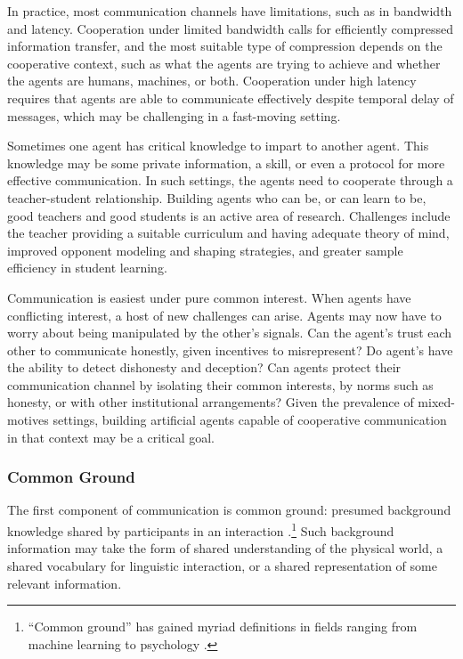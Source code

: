 \documentclass[11pt, a4paper, logo, onecolumn, nonumbering]{deepmind}
\begin{document}
In practice, most communication channels have limitations, such as in bandwidth and latency. 
Cooperation under limited bandwidth calls for efficiently compressed information transfer, and the most suitable type of compression depends on the cooperative context, such as what the agents are trying to achieve and whether the agents are humans, machines, or both. Cooperation under high latency requires that agents are able to communicate effectively despite temporal delay of messages, which may be challenging in a fast-moving setting.

Sometimes one agent has critical knowledge to impart to another agent. This knowledge may be some private information, a skill, or even a protocol for more effective communication. In such settings, the agents need to cooperate through a teacher-student relationship. Building agents who can be, or can learn to be, good teachers and good students is an active area of research. Challenges include the teacher providing a suitable curriculum and having adequate theory of mind, improved opponent modeling and shaping strategies, and greater sample efficiency in student learning.  




Communication is easiest under pure common interest. When agents have conflicting interest, a host of new challenges can arise. Agents may now have to worry about being manipulated by the other's signals. Can the agent's trust each other to communicate honestly, given incentives to misrepresent? Do agent's have the ability to detect dishonesty and deception? Can agents protect their communication channel by isolating their common interests, by norms such as honesty, or with other institutional arrangements? Given the prevalence of mixed-motives settings, building artificial agents capable of cooperative communication in that context may be a critical goal. 






\subsubsection{Common Ground}
The first component of communication is common ground: presumed background knowledge shared by participants in an interaction \cite{stalnaker2002common}.\footnote{``Common ground'' has gained myriad definitions in fields ranging from machine learning to psychology \cite{Traum1994Computational, Pickering2004Toward}.} Such background information may take the form of shared understanding of the physical world, a shared vocabulary for linguistic interaction, or a shared representation of some relevant information. 
\end{document}
